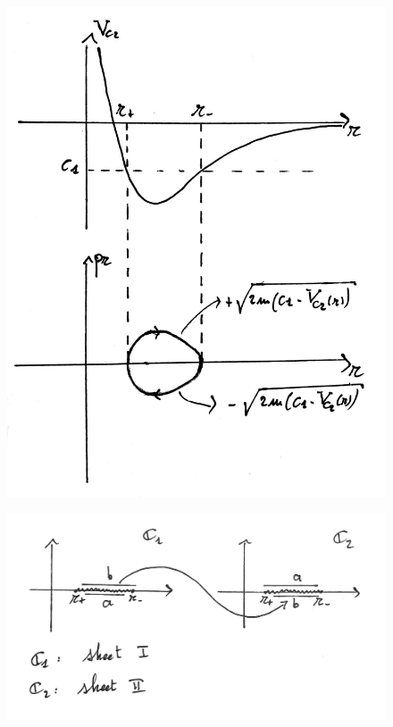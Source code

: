 \documentclass[main.tex]{subfiles}
\begin{document}
\begin{example}
	\begin{figure}[H]
		\centering
		\includegraphics[width=.7\textwidth]{figures/KeplerCompactFiber.jpeg}
		\caption{}
		\label{fig:KeplerCompactFiber}
	\end{figure}
	\begin{figure}[H]
		\centering
		\includegraphics[width=.85\textwidth]{figures/MultivaluedFunctionDef.jpeg}
		\caption{}
		\label{fig:MultivaluedFunctionDef}
	\end{figure}


\end{example}
\end{document}
